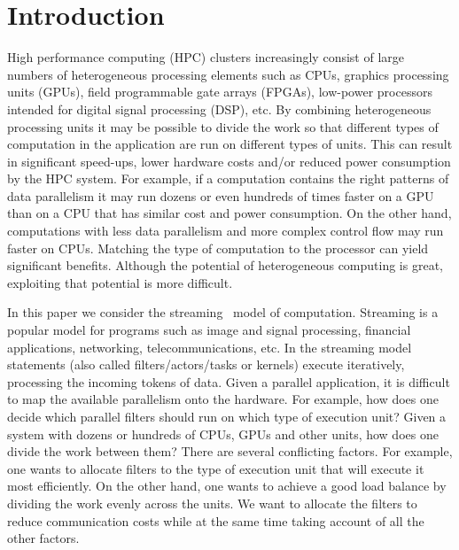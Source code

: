 \section{Introduction}
\label{sec:introduction}

High performance computing (HPC) clusters increasingly consist of large numbers
of heterogeneous processing elements such as CPUs, graphics processing units
(GPUs), field programmable gate arrays (FPGAs), low-power processors intended
for digital signal processing (DSP), etc. By combining heterogeneous
processing units it may be possible to divide the work so that different
types of computation in the application are run on different types of
units. This can result in significant speed-ups, lower hardware costs
and/or reduced power consumption by the HPC system.  For example, if a
computation contains the right patterns of data parallelism it may run
dozens or even hundreds of times faster on a GPU than on a CPU that has
similar cost and power consumption. On the other hand, computations with
less data parallelism and more complex control flow may run faster on
CPUs. Matching the type of computation to the processor can yield
significant benefits. Although the potential of heterogeneous computing is
great, exploiting that potential is more difficult.

In this paper we consider the streaming~\cite{jbuck94} model of
computation. Streaming is a popular model for programs such as image and
signal processing, financial applications, networking,
telecommunications, etc. In the streaming model statements (also called
filters/actors/tasks or kernels) execute iteratively, processing the incoming
tokens of data. Given a parallel application, it is
difficult to map the available parallelism onto the hardware. For
example, how does one decide which parallel filters should run on which
type of execution unit? Given a system with dozens or hundreds of CPUs,
GPUs and other units, how does one divide the work between them?  There
are several conflicting factors. For example, one wants to allocate
filters to the type of execution unit that will execute it most
efficiently. On the other hand, one wants to achieve a good load balance
by dividing the work evenly across the units. %
We want to allocate the filters to reduce communication costs while at the
same time taking account of all the other factors.

